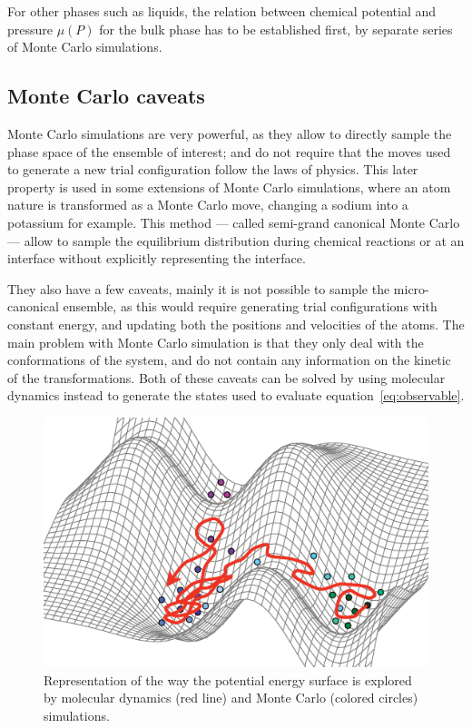 \documentclass[thesis]{subfiles}
\begin{document}
For other phases such as liquids, the relation between chemical potential and
pressure $\mu(P)$ for the bulk phase has to be established first, by separate
series of Monte Carlo simulations.

\subsection{Monte Carlo caveats}

Monte Carlo simulations are very powerful, as they allow to directly sample the
phase space of the ensemble of interest; and do not require that the moves used
to generate a new trial configuration follow the laws of physics. This later
property is used in some extensions of Monte Carlo simulations, where an atom
nature is transformed as a Monte Carlo move, changing a sodium into a potassium
for example. This method --- called semi-grand canonical Monte
Carlo\cite{Kofke1988} --- allow to sample the equilibrium distribution during
chemical reactions or at an interface without explicitly representing the
interface.

They also have a few caveats, mainly it is not possible to sample the
micro-canonical ensemble, as this would require generating trial configurations
with constant energy, and updating both the positions and velocities of the
atoms. The main problem with Monte Carlo simulation is that they only deal with
the conformations of the system, and do not contain any information on the
kinetic of the transformations. Both of these caveats can be solved by using
molecular dynamics instead to generate the states used to evaluate
equation~\eqref{eq:observable}.

\begin{figure}[b]
    \centering
    \includegraphics[width=\textwidth]{figures/images/mc-vs-md}
    \caption{Representation of the way the potential energy surface is explored
    by molecular dynamics (red line) and Monte Carlo (colored circles)
    simulations.}
    \label{fig:mc-vs-md}
\end{figure}
\end{document}
